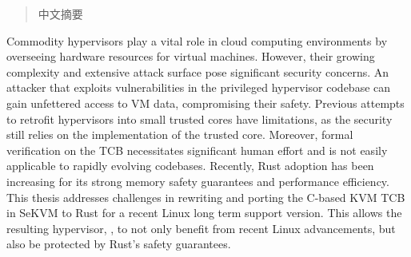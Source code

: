 
\begin{abstract}

中文摘要

\end{abstract}

\begin{abstract*}

Commodity hypervisors play a vital role in cloud computing environments by
overseeing hardware resources for virtual machines. However, their growing
complexity and extensive attack surface pose significant security concerns.
An attacker that exploits vulnerabilities in the privileged hypervisor
codebase can gain unfettered access to VM data, compromising their safety.
Previous attempts to retrofit hypervisors into small trusted cores have
limitations, as the security still relies on the implementation of the trusted
core. Moreover, formal verification on the TCB necessitates significant human
effort and is not easily applicable to rapidly evolving codebases.
Recently, Rust adoption has been increasing for its strong memory safety
guarantees and performance efficiency.
This thesis addresses challenges in rewriting and porting the C-based KVM TCB
in SeKVM to Rust for a recent Linux long term support version. This allows the
resulting hypervisor, \rustsec{}, to not only benefit from recent Linux
advancements, but also be protected by Rust's safety guarantees.

\end{abstract*}
